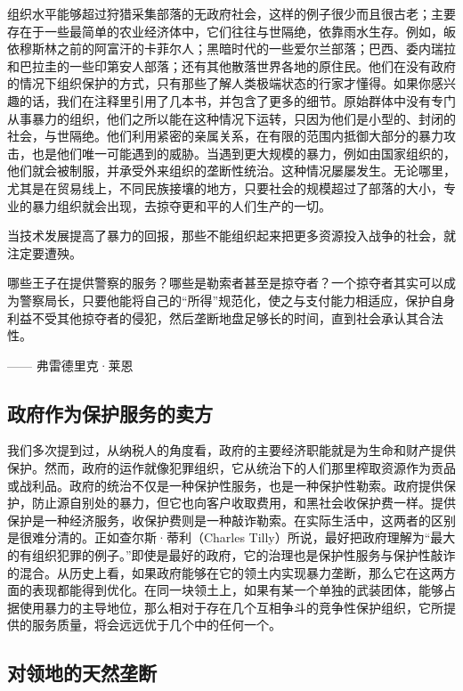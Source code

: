 组织水平能够超过狩猎采集部落的无政府社会，这样的例子很少而且很古老；主要存在于一些最简单的农业经济体中，它们往往与世隔绝，依靠雨水生存。例如，皈依穆斯林之前的阿富汗的卡菲尔人；黑暗时代的一些爱尔兰部落；巴西、委内瑞拉和巴拉圭的一些印第安人部落；还有其他散落世界各地的原住民。他们在没有政府的情况下组织保护的方式，只有那些了解人类极端状态的行家才懂得。如果你感兴趣的话，我们在注释里引用了几本书，并包含了更多的细节。原始群体中没有专门从事暴力的组织，他们之所以能在这种情况下运转，只因为他们是小型的、封闭的社会，与世隔绝。他们利用紧密的亲属关系，在有限的范围内抵御大部分的暴力攻击，也是他们唯一可能遇到的威胁。当遇到更大规模的暴力，例如由国家组织的，他们就会被制服，并承受外来组织的垄断性统治。这种情况屡屡发生。无论哪里，尤其是在贸易线上，不同民族接壤的地方，只要社会的规模超过了部落的大小，专业的暴力组织就会出现，去掠夺更和平的人们生产的一切。

当技术发展提高了暴力的回报，那些不能组织起来把更多资源投入战争的社会，就注定要遭殃。

\begin{tcolorbox}
哪些王子在提供警察的服务？哪些是勒索者甚至是掠夺者？一个掠夺者其实可以成为警察局长，只要他能将自己的“所得”规范化，使之与支付能力相适应，保护自身利益不受其他掠夺者的侵犯，然后垄断地盘足够长的时间，直到社会承认其合法性。
\begin{flushright}
—— 弗雷德里克·莱恩
\end{flushright}
\end{tcolorbox}

\subsection{政府作为保护服务的卖方}
我们多次提到过，从纳税人的角度看，政府的主要经济职能就是为生命和财产提供保护。然而，政府的运作就像犯罪组织，它从统治下的人们那里榨取资源作为贡品或战利品。政府的统治不仅是一种保护性服务，也是一种保护性勒索。政府提供保护，防止源自别处的暴力，但它也向客户收取费用，和黑社会收保护费一样。提供保护是一种经济服务，收保护费则是一种敲诈勒索。在实际生活中，这两者的区别是很难分清的。正如查尔斯·蒂利（Charles Tilly）所说，最好把政府理解为“最大的有组织犯罪的例子。”即使是最好的政府，它的治理也是保护性服务与保护性敲诈的混合。从历史上看，如果政府能够在它的领土内实现暴力垄断，那么它在这两方面的表现都能得到优化。在同一块领土上，如果有某一个单独的武装团体，能够占据使用暴力的主导地位，那么相对于存在几个互相争斗的竞争性保护组织，它所提供的服务质量，将会远远优于几个中的任何一个。

\subsection{对领地的天然垄断}

